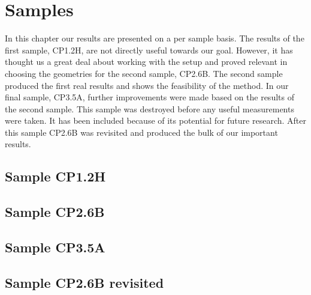 \chapter{Samples}
In this chapter our results are presented on a per sample basis. The results of the first sample, CP1.2H, are not directly useful towards our goal. However, it has thought us a great deal about working with the setup and proved relevant in choosing the geometries for the second sample, CP2.6B. The second sample produced the first real results and shows the feasibility of the method. In our final sample, CP3.5A, further improvements were made based on the results of the second sample. This sample was destroyed before any useful measurements were taken. It has been included because of its potential for future research. After this sample CP2.6B was revisited and produced the bulk of our important results.

\section{Sample CP1.2H}


\section{Sample CP2.6B}


\section{Sample CP3.5A}


\section{Sample CP2.6B revisited}
